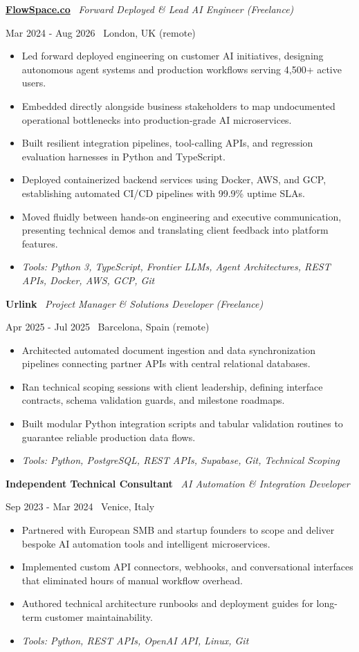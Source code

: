 \documentclass[a4paper,10pt]{article}
\newcommand{\role}[4]{%
  \vspace{2pt}\noindent
  \begin{minipage}[t]{0.70\textwidth}\raggedright\textbf{#1} \textbullet\ \textit{#3}\end{minipage}%
  \hfill
  \begin{minipage}[t]{0.28\textwidth}\raggedleft\footnotesize\color{gray}#2 \textbullet\ #4\end{minipage}%
  \vspace{1pt}%
}
\begin{document}
\role{\href{https://flowspace.co}{FlowSpace.co}}{Mar 2024 - Aug 2026}{Forward Deployed \& Lead AI Engineer (Freelance)}{London, UK (remote)}
\begin{itemize}
  \item Led forward deployed engineering on customer AI initiatives, designing autonomous agent systems and production workflows serving 4,500+ active users.
  \item Embedded directly alongside business stakeholders to map undocumented operational bottlenecks into production-grade AI microservices.
  \item Built resilient integration pipelines, tool-calling APIs, and regression evaluation harnesses in Python and TypeScript.
  \item Deployed containerized backend services using Docker, AWS, and GCP, establishing automated CI/CD pipelines with 99.9\% uptime SLAs.
  \item Moved fluidly between hands-on engineering and executive communication, presenting technical demos and translating client feedback into platform features.
  \item \textit{Tools: Python 3, TypeScript, Frontier LLMs, Agent Architectures, REST APIs, Docker, AWS, GCP, Git}
\end{itemize}

\role{Urlink}{Apr 2025 - Jul 2025}{Project Manager \& Solutions Developer (Freelance)}{Barcelona, Spain (remote)}
\begin{itemize}
  \item Architected automated document ingestion and data synchronization pipelines connecting partner APIs with central relational databases.
  \item Ran technical scoping sessions with client leadership, defining interface contracts, schema validation guards, and milestone roadmaps.
  \item Built modular Python integration scripts and tabular validation routines to guarantee reliable production data flows.
  \item \textit{Tools: Python, PostgreSQL, REST APIs, Supabase, Git, Technical Scoping}
\end{itemize}

\role{Independent Technical Consultant}{Sep 2023 - Mar 2024}{AI Automation \& Integration Developer}{Venice, Italy}
\begin{itemize}
  \item Partnered with European SMB and startup founders to scope and deliver bespoke AI automation tools and intelligent microservices.
  \item Implemented custom API connectors, webhooks, and conversational interfaces that eliminated hours of manual workflow overhead.
  \item Authored technical architecture runbooks and deployment guides for long-term customer maintainability.
  \item \textit{Tools: Python, REST APIs, OpenAI API, Linux, Git}
\end{itemize}
\end{document}
